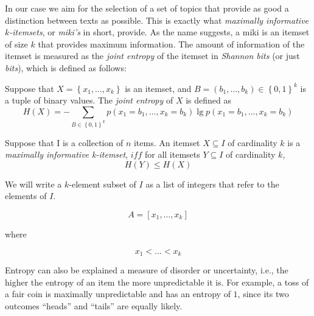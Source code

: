 In our case we aim for the selection of a set of topics that provide as good a distinction between texts as possible.
This is exactly what \emph{maximally informative $k$-itemsets}\cite{knobbe06}, or \emph{miki's} in short, provide.
As the name suggests, a miki is an itemset of size $k$ that provides maximum information.
The amount of information of the itemset is measured as the \emph{joint entropy} of the itemset in \emph{Shannon bits} (or just \emph{bits}), which is defined as follows: \cite{knobbe06}

\begin{definition}
    Suppose that $X = \left\{ x_{1}, \dots, x_{k} \right\}$ is an itemset, and $B = \left( b_{1}, \dots, b_{k} \right) \in \left\{ 0, 1 \right\}^{k}$ is a tuple of binary values. The \emph{joint entropy} of $X$ is defined as
    \begin{equation*}
        H(X) = -\sum_{B \in \left\{ 0, 1 \right\}^{k}} p \left( x_{1} = b_{1}, \dots, x_{k} = b_{k} \right) \lg p \left( x_{1} = b_{1}, \dots, x_{k} = b_{k} \right)
    \end{equation*}
    \label{def:joint_entropy}
\end{definition}

\begin{definition}
    Suppose that I is a collection of $n$ items. An itemset $X \subseteq I$ of cardinality $k$ is a \emph{maximally informative k-itemset}, $iff$ for all itemsets $Y \subseteq I$ of cardinality $k$,
    \begin{equation}
        H(Y) \leq H(X)
    \end{equation}
    \label{def:miki}
\end{definition}

We will write a $k$-element subset of $I$ as a list of integers that refer to the elements of $I$.

\begin{equation*}
    A = \left[ x_{1}, \dots, x_{k} \right]
\end{equation*}

\noindent where

\begin{equation*}
    x_{1} < \dots < x_{k}
\end{equation*}

Entropy can also be explained a measure of disorder or uncertainty, i.e., the higher the entropy of an item the more unpredictable it is.
For example, a toss of a fair coin is maximally unpredictable and has an entropy of $1$, since its two outcomes ``heads'' and ``tails'' are equally likely.


